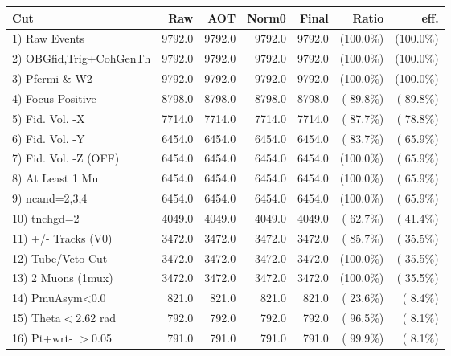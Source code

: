  \begin{table}[h!]\centering
 \begin{tabular}{||l||r|r|r|r|r|r||}
 \hline
 \hline
 Cut & Raw & AOT & Norm0 & Final & Ratio & eff.       \\
 \hline
  1) Raw Events           &       9792.0 &       9792.0 &       9792.0 &       9792.0 & (100.0\%) & (100.0\%) \\
  2) OBGfid,Trig+CohGenTh &       9792.0 &       9792.0 &       9792.0 &       9792.0 & (100.0\%) & (100.0\%) \\
  3) Pfermi \& W2         &       9792.0 &       9792.0 &       9792.0 &       9792.0 & (100.0\%) & (100.0\%) \\
  4) Focus Positive       &       8798.0 &       8798.0 &       8798.0 &       8798.0 & ( 89.8\%) & ( 89.8\%) \\
  5) Fid. Vol. -X         &       7714.0 &       7714.0 &       7714.0 &       7714.0 & ( 87.7\%) & ( 78.8\%) \\
  6) Fid. Vol. -Y         &       6454.0 &       6454.0 &       6454.0 &       6454.0 & ( 83.7\%) & ( 65.9\%) \\
  7) Fid. Vol. -Z (OFF)   &       6454.0 &       6454.0 &       6454.0 &       6454.0 & (100.0\%) & ( 65.9\%) \\
  8) At Least 1 Mu        &       6454.0 &       6454.0 &       6454.0 &       6454.0 & (100.0\%) & ( 65.9\%) \\
  9) ncand=2,3,4          &       6454.0 &       6454.0 &       6454.0 &       6454.0 & (100.0\%) & ( 65.9\%) \\
 10) tnchgd=2             &       4049.0 &       4049.0 &       4049.0 &       4049.0 & ( 62.7\%) & ( 41.4\%) \\
 11) +/- Tracks (V0)      &       3472.0 &       3472.0 &       3472.0 &       3472.0 & ( 85.7\%) & ( 35.5\%) \\
 12) Tube/Veto Cut        &       3472.0 &       3472.0 &       3472.0 &       3472.0 & (100.0\%) & ( 35.5\%) \\
 13) 2 Muons (1mux)       &       3472.0 &       3472.0 &       3472.0 &       3472.0 & (100.0\%) & ( 35.5\%) \\
 14) PmuAsym<0.0          &        821.0 &        821.0 &        821.0 &        821.0 & ( 23.6\%) & (  8.4\%) \\
 15) Theta$<$2.62 rad     &        792.0 &        792.0 &        792.0 &        792.0 & ( 96.5\%) & (  8.1\%) \\
 16) Pt+wrt- $>$0.05      &        791.0 &        791.0 &        791.0 &        791.0 & ( 99.9\%) & (  8.1\%) \\

\end{tabular}
\end{table}
